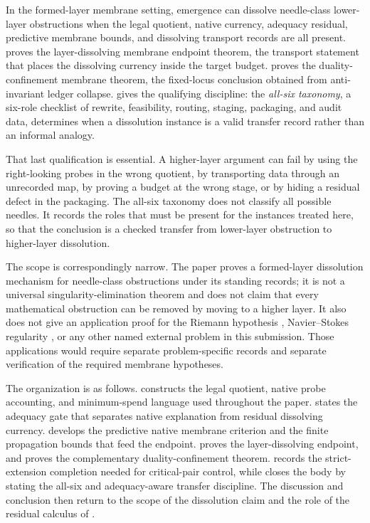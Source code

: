 \documentclass[11pt]{article}
\theoremstyle{definition}
\begin{document}
In the formed-layer membrane setting, emergence can dissolve
needle-class lower-layer obstructions when the legal quotient, native
currency, adequacy residual, predictive membrane bounds, and dissolving
transport records are all present.   proves the
layer-dissolving membrane endpoint theorem, the transport statement that
places the dissolving currency inside the target budget.
 proves the duality-confinement membrane
theorem, the fixed-locus conclusion obtained from anti-invariant ledger
collapse.   gives the qualifying discipline: the
\emph{all-six taxonomy}, a six-role checklist of rewrite, feasibility,
routing, staging, packaging, and audit data, determines when a
dissolution instance is a valid transfer record rather than an informal
analogy.

That last qualification is essential.  A higher-layer argument can fail
by using the right-looking probes in the wrong quotient, by transporting
data through an unrecorded map, by proving a budget at the wrong stage,
or by hiding a residual defect in the packaging.  The all-six taxonomy
does not classify all possible needles.  It records the roles that must
be present for the instances treated here, so that the conclusion is a
checked transfer from lower-layer obstruction to higher-layer
dissolution.

The scope is correspondingly narrow.  The paper proves a formed-layer
dissolution mechanism for needle-class obstructions under its standing
records; it is not a universal singularity-elimination theorem and does
not claim that every mathematical obstruction can be removed by moving
to a higher layer.  It also does not give an application proof for the
Riemann hypothesis \citep{Bombieri2000Riemann}, Navier--Stokes regularity
\citep{Fefferman2000NavierStokes}, or any other named external problem
in this submission.  Those applications would require
separate problem-specific records and separate verification of the
required membrane hypotheses.

The organization is as follows.   constructs the
legal quotient, native probe accounting, and minimum-spend language used
throughout the paper.   states the adequacy gate
that separates native explanation from residual dissolving currency.
 develops the predictive native membrane
criterion and the finite propagation bounds that feed the endpoint.
 proves the layer-dissolving endpoint, and
 proves the complementary
duality-confinement theorem.   records the
strict-extension completion needed for critical-pair control, while
 closes the body by stating the all-six and
adequacy-aware transfer discipline.  The discussion and conclusion then
return to the scope of the dissolution claim and the role of the
residual calculus of \citet{Tsiokos2026XiCompanion}.
\end{document}
